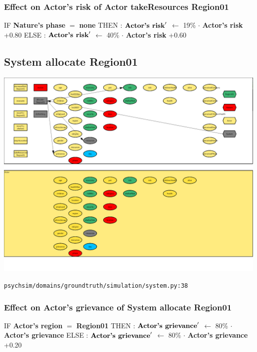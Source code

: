 \documentclass{article}%
\begin{document}
%
\subsubsection{Effect on Actor's risk of Actor takeResources Region01}%
\label{ssubsec:Effect on Actor's risk of Actor takeResources Region01}%
\begin{flushleft}%
IF %
\textbf{Nature's phase}%
$=$%
\textbf{none}%
\linebreak%
\hspace*{2em}%
THEN %
: %
$\mbox{\textbf{Actor's risk}} '$%
$\leftarrow$%
19\%%
$\cdot$%
\textbf{Actor's risk}%
+0.80%
\linebreak%
\hspace*{2em}%
ELSE %
: %
$\mbox{\textbf{Actor's risk}} '$%
$\leftarrow$%
40\%%
$\cdot$%
\textbf{Actor's risk}%
+0.60%
\end{flushleft}

%
\subsection{System allocate Region01}%
\label{subsec:System allocate Region01}%
\includegraphics[width=\textwidth]{images/System-allocate-Region01.png}%
\begin{flushleft}%
\verb|psychsim/domains/groundtruth/simulation/system.py:38|%
\end{flushleft}%
\subsubsection{Effect on Actor's grievance of System allocate Region01}%
\label{ssubsec:Effect on Actor's grievance of System allocate Region01}%
\begin{flushleft}%
IF %
\textbf{Actor's region}%
$=$%
\textbf{Region01}%
\linebreak%
\hspace*{2em}%
THEN %
: %
$\mbox{\textbf{Actor's grievance}} '$%
$\leftarrow$%
80\%%
$\cdot$%
\textbf{Actor's grievance}%
\linebreak%
\hspace*{2em}%
ELSE %
: %
$\mbox{\textbf{Actor's grievance}} '$%
$\leftarrow$%
80\%%
$\cdot$%
\textbf{Actor's grievance}%
+0.20%
\end{flushleft}
\end{document}

